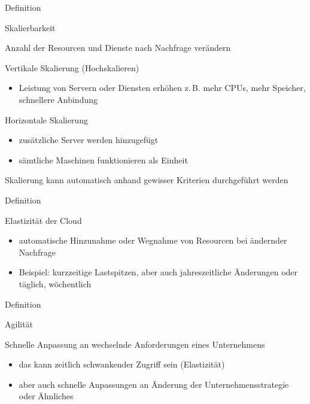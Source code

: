 \documentclass{scrartcl}
\newenvironment{flashcard}[2][]{%
    #1
    \vfill
    \centerline{\Large{#2}}
    \vfill
\newpage
}
{\newpage}
\begin{document}
    \begin{flashcard}[Definition]{Skalierbarkeit}
        Anzahl der Resourcen und Dienste nach Nachfrage verändern

        \vspace{5mm}
        Vertikale Skalierung (Hochskalieren)
        \begin{itemize}
            \item Leistung von Servern oder Diensten erhöhen\newline
            z.\,B. mehr CPUs, mehr Speicher, schnellere Anbindung
        \end{itemize}

        Horizontale Skalierung
        \begin{itemize}
            \item zusätzliche Server werden hinzugefügt
            \item sämtliche Maschinen funktionieren als Einheit
        \end{itemize}

        \vspace{5mm}
        Skalierung kann automatisch anhand gewisser Kriterien durchgeführt werden
    \end{flashcard}

    \begin{flashcard}[Definition]{Elastizität der Cloud}
        \begin{itemize}
            \item automatische Hinzunahme oder Wegnahme von Resourcen bei ändernder Nachfrage
            \item Beispiel: kurzzeitige Lastspitzen, aber auch jahreszeitliche Änderungen oder täglich, wöchentlich
        \end{itemize}

    \end{flashcard}

    \begin{flashcard}[Definition]{Agilität}

        \vspace{5mm}
        Schnelle Anpassung an wechselnde Anforderungen eines Unternehmens
        \begin{itemize}
            \item das kann zeitlich schwankender Zugriff sein (Elastizität)
            \item aber auch schnelle Anpassungen an Änderung der Unternehmensstrategie oder Ähnliches
        \end{itemize}

    \end{flashcard}
\end{document}
